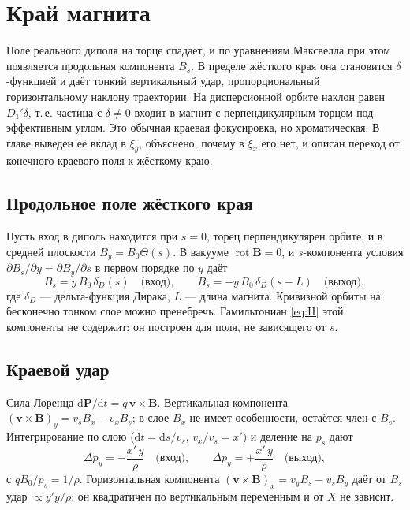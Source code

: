 \section{Край магнита}
\label{sec:edge}

Поле реального диполя на торце спадает, и по уравнениям Максвелла при этом появляется продольная компонента $B_s$. В пределе жёсткого края она становится $\delta$-функцией и даёт тонкий вертикальный удар, пропорциональный горизонтальному наклону траектории. На дисперсионной орбите наклон равен $D_1'\delta$, т.\,е. частица с $\delta\neq0$ входит в магнит с перпендикулярным торцом под эффективным углом. Это обычная краевая фокусировка, но хроматическая. В главе выведен её вклад в $\xi_y$, объяснено, почему в $\xi_x$ его нет, и описан переход от конечного краевого поля к жёсткому краю.

\subsection{Продольное поле жёсткого края}

Пусть вход в диполь находится при $s=0$, торец перпендикулярен орбите, и в средней плоскости $B_y=B_0\Theta(s)$. В вакууме $\operatorname{rot}\mathbf{B}=0$, и $s$-компонента условия $\partial B_s/\partial y=\partial B_y/\partial s$ в первом порядке по $y$ даёт
\begin{equation}
\label{eq:Bs}
B_s=y\,B_0\,\delta_D(s)\quad\text{(вход)},
\qquad
B_s=-y\,B_0\,\delta_D(s-L)\quad\text{(выход)},
\end{equation}
где $\delta_D$ --- дельта-функция Дирака, $L$ --- длина магнита. Кривизной орбиты на бесконечно тонком слое можно пренебречь. Гамильтониан \eqref{eq:H} этой компоненты не содержит: он построен для поля, не зависящего от $s$.

\subsection{Краевой удар}

Сила Лоренца $\mathrm{d}\mathbf{P}/\mathrm{d}t=q\,\mathbf{v}\times\mathbf{B}$. Вертикальная компонента $(\mathbf{v}\times\mathbf{B})_y=v_sB_x-v_xB_s$; в слое $B_x$ не имеет особенности, остаётся член с $B_s$. Интегрирование по слою ($\mathrm{d}t=\mathrm{d}s/v_s$, $v_x/v_s=x'$) и деление на $p_s$ дают
\begin{equation}
\label{eq:kick}
\Delta p_y=-\frac{x'\,y}{\rho}\quad\text{(вход)},
\qquad
\Delta p_y=+\frac{x'\,y}{\rho}\quad\text{(выход)},
\end{equation}
с $qB_0/p_s=1/\rho$. Горизонтальная компонента $(\mathbf{v}\times\mathbf{B})_x=v_yB_s-v_sB_y$ даёт от $B_s$ удар $\propto y'y/\rho$: он квадратичен по вертикальным переменным и от $X$ не зависит.

